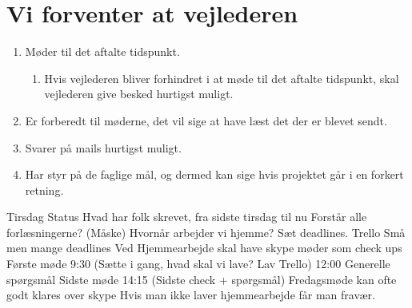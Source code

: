 \section{Vi forventer at vejlederen}
\begin{enumerate}
\item Møder til det aftalte tidspunkt.
\begin{enumerate}
\item Hvis vejlederen bliver forhindret i at møde til det aftalte tidspunkt, skal vejlederen give besked hurtigst muligt.
\end{enumerate}
\item Er forberedt til møderne, det vil sige at have læst det der er blevet sendt.
\item Svarer på mails hurtigst muligt.
\item Har styr på de faglige mål, og dermed kan sige hvis projektet går i en forkert retning.
\end{enumerate}

Tirsdag
Status
Hvad har folk skrevet, fra sidste tirsdag til nu
Forstår alle forlæsningerne? (Måske)
Hvornår arbejder vi hjemme?
Sæt deadlines.
Trello
Små men mange deadlines
Ved Hjemmearbejde skal have skype møder som check ups
Første møde 9:30 (Sætte i gang, hvad skal vi lave? Lav Trello)
12:00 Generelle spørgsmål
Sidste møde 14:15 (Sidste check + spørgsmål)
Fredagsmøde kan ofte godt klares over skype
Hvis man ikke laver hjemmearbejde får man fravær.
